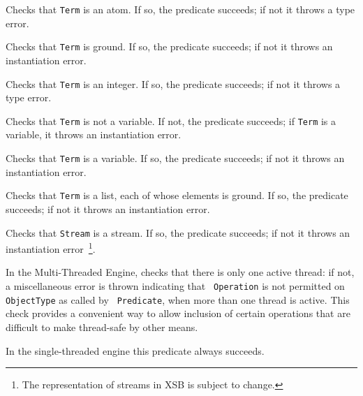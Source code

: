 \begin{description}
Checks that {\tt Term} is an atom.  If so, the predicate succeeds;
if not it throws a type error.

Checks that {\tt Term} is ground.  If so, the predicate succeeds;
if not it throws an instantiation error.

Checks that {\tt Term} is an integer.  If so, the predicate succeeds;
if not it throws a type error.

Checks that {\tt Term} is not a variable.  If not, the predicate succeeds;
if {\tt Term} is a variable,  it throws an instantiation error.

Checks that {\tt Term} is a variable.  If so, the predicate succeeds;
if not it throws an instantiation error.

Checks that {\tt Term} is a list, each of whose elements is ground.
If so, the predicate succeeds; if not it throws an instantiation
error.
	    
Checks that {\tt Stream} is a stream.  If so, the predicate succeeds;
if not it throws an instantiation error~\footnote{The representation
of streams in XSB is subject to change.}.

%
In the Multi-Threaded Engine, checks that there is only one active
thread: if not, a miscellaneous error is thrown indicating that {\tt
  Operation} is not permitted on {\tt ObjectType} as called by {\tt
  Predicate}, when more than one thread is active.  This check
provides a convenient way to allow inclusion of certain operations
that are difficult to make thread-safe by other means.

In the single-threaded engine this predicate always succeeds.

\end{description}

